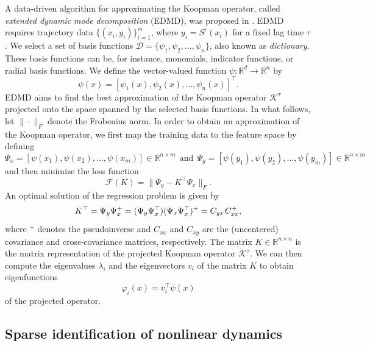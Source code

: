 \documentclass
[
    a4paper,
    DIV=11,
    abstract=true,
    11pt,
]
{scrartcl}
\newcommand{\R}{\mathbb{R}}                                      %
\newcommand{\ts}{\hspace*{0.1em}}                                %
\theoremstyle{definition}
\begin{document}
A data-driven algorithm for approximating the Koopman operator, called \emph{extended dynamic mode decomposition} (EDMD), was proposed in \cite{williams2015data}. EDMD requires trajectory data $ \{(x_i, y_i)\}_{i=1}^m $, where $ y_i = S^\tau(x_i) $ for a fixed lag time $ \tau $. We select a set of basis functions $\mathcal{D} = \{\psi_1, \psi_2, \dots, \psi_n \} $, also known as \emph{dictionary}. These basis functions can be, for instance, monomials, indicator functions, or radial basis functions. We define the vector-valued function $ \psi \colon \R^d \rightarrow \R^n $ by
\begin{equation*} 
    \psi(x) = [\psi_1(x), \psi_2(x), \dots, \psi_n(x)]^\top.
\end{equation*}
EDMD aims to find the best approximation of the Koopman operator $ \mathcal{K}^\tau $ projected onto the space spanned by the selected basis functions. In what follows, let $ \|\cdot\|_F $ denote the Frobenius norm. In order to obtain an approximation of the Koopman operator, we first map the training data to the feature space by defining
\begin{equation*}
    \Psi_x = [\psi(x_{1}),\psi(x_{2}),\ldots,\psi(x_{m})] \in \R^{n \times m}
    ~~ \text{and} ~~
    \Psi_y = [\psi(y_{1}),\psi(y_{2}),\ldots,\psi(y_{m})] \in \R^{n \times m}
\end{equation*}
and then minimize the loss function
\begin{equation*}
    \mathcal{F}(K) = \big \|\Psi_y - K^\top \Psi_x\big \|_F.
\end{equation*}
An optimal solution of the regression problem is given by
\begin{equation*}
    K^\top = \Psi_y \Psi_x^+ = (\Psi_y \Psi_x^\top) (\Psi_x \Psi_x^\top)^+ = C_{yx} \ts C_{xx}^+,
\end{equation*}
where $ ^+ $ denotes the pseudoinverse and $ C_{xx} $ and $ C_{xy} $ are the (uncentered) covariance and cross-covariance matrices, respectively. The matrix $ K \in \R^{n \times n} $ is the matrix representation of the projected Koopman operator $ \mathcal{K}^\tau $. We can then compute the eigenvalues $ \lambda_i $ and the eigenvectors $ v_i $ of the matrix $ K $ to obtain eigenfunctions
\begin{equation*}
    \varphi_i(x) = v_i^{\top}\psi(x)
\end{equation*}
of the projected operator.

\subsection{Sparse identification of nonlinear dynamics}
\end{document}
